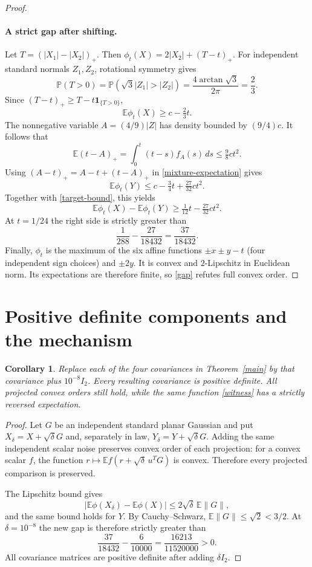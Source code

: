 \documentclass[11pt]{article}
\newtheorem{corollary}[theorem]{Corollary}
\newcommand{\E}{\mathbb E}
\newcommand{\Pp}{\mathbb P}
\begin{document}
\begin{proof}
\paragraph{A strict gap after shifting.}
Let $T=(|X_1|-|X_2|)_+$. Then $\phi_t(X)=2|X_2|+(T-t)_+$. For independent standard normals $Z_1,Z_2$, rotational symmetry gives
\[
 \Pp(T>0)=\Pp(\sqrt3|Z_1|>|Z_2|)
 =\frac{4\arctan\sqrt3}{2\pi}=\frac23.
\]
Since $(T-t)_+\ge T-t\mathbf1_{\{T>0\}}$,
\begin{equation}\label{target-bound}
 \E\phi_t(X)\ge c-\tfrac23t.
\end{equation}
The nonnegative variable $A=(4/9)|Z|$ has density bounded by $(9/4)c$. It follows that
\[
 \E(t-A)_+=\int_0^t(t-s)f_A(s)\,ds\le\tfrac98 c t^2.
\]
Using $(A-t)_+=A-t+(t-A)_+$ in \eqref{mixture-expectation} gives
\[
 \E\phi_t(Y)\le c-\tfrac34t+\tfrac{27}{32}ct^2.
\]
Together with \eqref{target-bound}, this yields
\begin{equation}\label{general-gap}
 \E\phi_t(X)-\E\phi_t(Y)\ge\tfrac1{12}t-\tfrac{27}{32}ct^2.
\end{equation}
At $t=1/24$ the right side is strictly greater than
\[
 \frac1{288}-\frac{27}{18432}=\frac{37}{18432}.
\]
Finally, $\phi_t$ is the maximum of the six affine functions $\pm x\pm y-t$ (four independent sign choices) and $\pm2y$. It is convex and $2$-Lipschitz in Euclidean norm. Its expectations are therefore finite, so \eqref{gap} refutes full convex order.
\end{proof}

\section{Positive definite components and the mechanism}
\begin{corollary}\label{smooth}
Replace each of the four covariances in Theorem~\ref{main} by that covariance plus $10^{-8}I_2$. Every resulting covariance is positive definite. All projected convex orders still hold, while the same function \eqref{witness} has a strictly reversed expectation.
\end{corollary}
\begin{proof}
Let $G$ be an independent standard planar Gaussian and put $X_\delta=X+\sqrt\delta G$ and, separately in law, $Y_\delta=Y+\sqrt\delta G$. Adding the same independent scalar noise preserves convex order of each projection: for a convex scalar $f$, the function $r\mapsto\E f(r+\sqrt\delta\,u^TG)$ is convex. Therefore every projected comparison is preserved.

The Lipschitz bound gives
\[
 |\E\phi(X_\delta)-\E\phi(X)|\le2\sqrt\delta\,\E\|G\|,
\]
and the same bound holds for $Y$. By Cauchy--Schwarz, $\E\|G\|\le\sqrt2<3/2$. At $\delta=10^{-8}$ the new gap is therefore strictly greater than
\[
 \frac{37}{18432}-\frac6{10000}=\frac{16213}{11520000}>0.
\]
All covariance matrices are positive definite after adding $\delta I_2$.
\end{proof}
\end{document}

